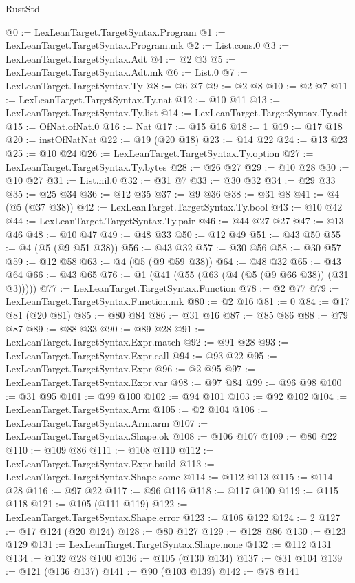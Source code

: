 \begin{lexlean}{RustStd}
\begin{coremodule}
@0 := LexLeanTarget.TargetSyntax.Program
@1 := LexLeanTarget.TargetSyntax.Program.mk
@2 := List.cons.{0}
@3 := LexLeanTarget.TargetSyntax.Adt
@4 := @2 @3
@5 := LexLeanTarget.TargetSyntax.Adt.mk
@6 := List.{0}
@7 := LexLeanTarget.TargetSyntax.Ty
@8 := @6 @7
@9 := @2 @8
@10 := @2 @7
@11 := LexLeanTarget.TargetSyntax.Ty.nat
@12 := @10 @11
@13 := LexLeanTarget.TargetSyntax.Ty.list
@14 := LexLeanTarget.TargetSyntax.Ty.adt
@15 := OfNat.ofNat.{0}
@16 := Nat
@17 := @15 @16
@18 := 1
@19 := @17 @18
@20 := instOfNatNat
@22 := @19 (@20 @18)
@23 := @14 @22
@24 := @13 @23
@25 := @10 @24
@26 := LexLeanTarget.TargetSyntax.Ty.option
@27 := LexLeanTarget.TargetSyntax.Ty.bytes
@28 := @26 @27
@29 := @10 @28
@30 := @10 @27
@31 := List.nil.{0}
@32 := @31 @7
@33 := @30 @32
@34 := @29 @33
@35 := @25 @34
@36 := @12 @35
@37 := @9 @36
@38 := @31 @8
@41 := @4 (@5 (@37 @38))
@42 := LexLeanTarget.TargetSyntax.Ty.bool
@43 := @10 @42
@44 := LexLeanTarget.TargetSyntax.Ty.pair
@46 := @44 @27 @27
@47 := @13 @46
@48 := @10 @47
@49 := @48 @33
@50 := @12 @49
@51 := @43 @50
@55 := @4 (@5 (@9 @51 @38))
@56 := @43 @32
@57 := @30 @56
@58 := @30 @57
@59 := @12 @58
@63 := @4 (@5 (@9 @59 @38))
@64 := @48 @32
@65 := @43 @64
@66 := @43 @65
@76 := @1 (@41 (@55 (@63 (@4 (@5 (@9 @66 @38)) (@31 @3)))))
@77 := LexLeanTarget.TargetSyntax.Function
@78 := @2 @77
@79 := LexLeanTarget.TargetSyntax.Function.mk
@80 := @2 @16
@81 := 0
@84 := @17 @81 (@20 @81)
@85 := @80 @84
@86 := @31 @16
@87 := @85 @86
@88 := @79 @87
@89 := @88 @33
@90 := @89 @28
@91 := LexLeanTarget.TargetSyntax.Expr.match
@92 := @91 @28
@93 := LexLeanTarget.TargetSyntax.Expr.call
@94 := @93 @22
@95 := LexLeanTarget.TargetSyntax.Expr
@96 := @2 @95
@97 := LexLeanTarget.TargetSyntax.Expr.var
@98 := @97 @84
@99 := @96 @98
@100 := @31 @95
@101 := @99 @100
@102 := @94 @101
@103 := @92 @102
@104 := LexLeanTarget.TargetSyntax.Arm
@105 := @2 @104
@106 := LexLeanTarget.TargetSyntax.Arm.arm
@107 := LexLeanTarget.TargetSyntax.Shape.ok
@108 := @106 @107
@109 := @80 @22
@110 := @109 @86
@111 := @108 @110
@112 := LexLeanTarget.TargetSyntax.Expr.build
@113 := LexLeanTarget.TargetSyntax.Shape.some
@114 := @112 @113
@115 := @114 @28
@116 := @97 @22
@117 := @96 @116
@118 := @117 @100
@119 := @115 @118
@121 := @105 (@111 @119)
@122 := LexLeanTarget.TargetSyntax.Shape.error
@123 := @106 @122
@124 := 2
@127 := @17 @124 (@20 @124)
@128 := @80 @127
@129 := @128 @86
@130 := @123 @129
@131 := LexLeanTarget.TargetSyntax.Shape.none
@132 := @112 @131
@134 := @132 @28 @100
@136 := @105 (@130 @134)
@137 := @31 @104
@139 := @121 (@136 @137)
@141 := @90 (@103 @139)
@142 := @78 @141

\end{coremodule}
\end{lexlean}
